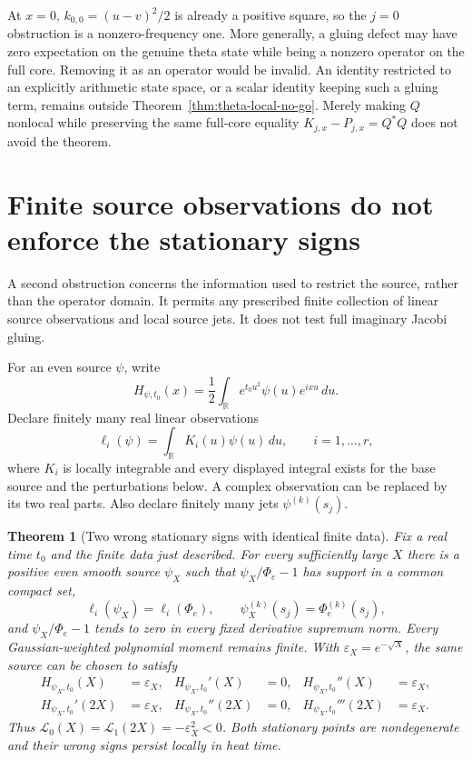 \documentclass[11pt]{article}
\numberwithin{equation}{section}
\newtheorem{theorem}{Theorem}[section]
\theoremstyle{definition}
\theoremstyle{remark}
\begin{document}
At $x=0$, $k_{0,0}=(u-v)^2/2$ is already a positive square, so the
$j=0$ obstruction is a nonzero-frequency one.  More generally, a
gluing defect may have zero expectation on the genuine theta state
while being a nonzero operator on the full core.  Removing it as an
operator would be invalid.  An identity restricted to an explicitly
arithmetic state space, or a scalar identity keeping such a gluing
term, remains outside Theorem~\ref{thm:theta-local-no-go}.  Merely
making $Q$ nonlocal while preserving the same full-core equality
$K_{j,x}-P_{j,x}=Q^*Q$ does not avoid the theorem.

\section{Finite source observations do not enforce the stationary signs}
\label{sec:theta-finite-observations}

A second obstruction concerns the information used to restrict the
source, rather than the operator domain.  It permits any prescribed
finite collection of linear source observations and local source jets.
It does not test full imaginary Jacobi gluing.

For an even source $\psi$, write
\[
 H_{\psi,t_0}(x)=\frac12\int_{\mathbb R}
             e^{t_0u^2}\psi(u)e^{ixu}\,du.
\]
Declare finitely many real linear observations
\begin{equation}
 \ell_i(\psi)=\int_{\mathbb R}K_i(u)\psi(u)\,du,
 \qquad i=1,\ldots,r,
 \label{eq:theta-finite-measurements}
\end{equation}
where $K_i$ is locally integrable and every displayed integral exists
for the base source and the perturbations below.  A complex observation
can be replaced by its two real parts.  Also declare finitely many jets
$\psi^{(k)}(s_j)$.

\begin{theorem}[Two wrong stationary signs with identical finite data]
\label{thm:theta-finite-controls}
Fix a real time $t_0$ and the finite data just described.  For every
sufficiently large $X$ there is a positive even smooth source $\psi_X$
such that $\psi_X/\Phi_e-1$ has support in a common compact set,
\[
 \ell_i(\psi_X)=\ell_i(\Phi_e),\qquad
 \psi_X^{(k)}(s_j)=\Phi_e^{(k)}(s_j),
\]
and $\psi_X/\Phi_e-1$ tends to zero in every fixed derivative supremum
norm. Every Gaussian-weighted polynomial moment remains finite. With
$\varepsilon_X=e^{-\sqrt X}$, the same source can be chosen to satisfy
\begin{align}
 H_{\psi_X,t_0}(X)&=\varepsilon_X,&
 H_{\psi_X,t_0}'(X)&=0,&
 H_{\psi_X,t_0}''(X)&=\varepsilon_X,
 \label{eq:theta-j0-control}\\
 H_{\psi_X,t_0}'(2X)&=\varepsilon_X,&
 H_{\psi_X,t_0}''(2X)&=0,&
 H_{\psi_X,t_0}'''(2X)&=\varepsilon_X.
 \label{eq:theta-j1-control}
\end{align}
Thus $\mathscr L_0(X)=\mathscr L_1(2X)=-\varepsilon_X^2<0$.
Both stationary points are nondegenerate and their wrong signs persist
locally in heat time.
\end{theorem}
\end{document}
